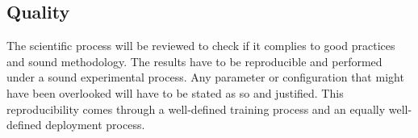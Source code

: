 
\subsection{Quality}

The scientific process will be reviewed to check if it complies to good practices and sound methodology. The results have to be reproducible and performed under a sound experimental process. Any parameter or configuration that might have been overlooked will have to be stated as so and justified. This reproducibility comes through a well-defined training process and an equally well-defined deployment process.
